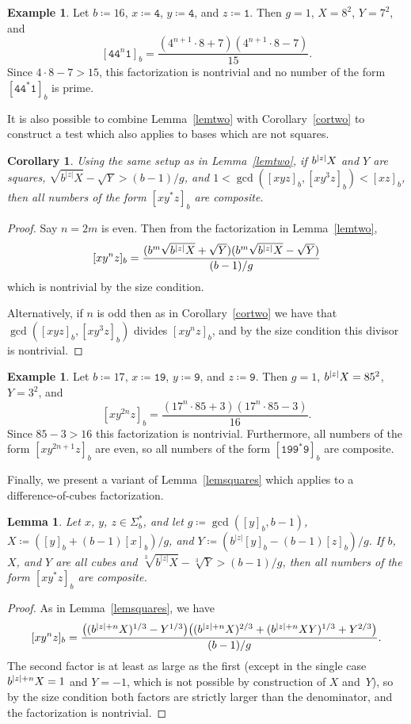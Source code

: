 \documentclass[12pt]{article}
\DeclarePairedDelimiter\abs{\lvert}{\rvert}
\theoremstyle{plain}
\newtheorem{corollary}[theorem]{Corollary}
\newtheorem{lemma}[theorem]{Lemma}
\theoremstyle{definition}
\newtheorem{example}[theorem]{Example}
\newcommand{\0}{\mathtt{0}}
\newcommand{\1}{\mathtt{1}}
\newcommand{\2}{\mathtt{2}}
\newcommand{\3}{\mathtt{3}}
\newcommand{\4}{\mathtt{4}}
\newcommand{\5}{\mathtt{5}}
\newcommand{\6}{\mathtt{6}}
\newcommand{\7}{\mathtt{7}}
\newcommand{\8}{\mathtt{8}}
\newcommand{\9}{\mathtt{9}}
\begin{document}
\begin{example}
Let $b\coloneqq16$, $x\coloneqq\4$, $y\coloneqq\4$, and $z\coloneqq\1$.  Then $g=1$, $X=8^2$, $Y=7^2$, and
\[ [\4\4^n\1]_b = \frac{(4^{n+1}\cdot8+7)(4^{n+1}\cdot8-7)}{15} . \]
Since $4\cdot8-7>15$, this factorization is nontrivial and no number of 
the form $[\4\4^*\1]_b$ is prime.
\end{example}

It is also possible to combine Lemma~\ref{lemtwo} with Corollary~\ref{cortwo} 
to construct a test which also applies to bases which are not squares.
\begin{corollary}
Using the same setup as in Lemma~\ref{lemtwo}, if\/ $b^{\abs{z}}X$ and $Y$ 
are squares, $\sqrt{b^{\lvert z\rvert}X}-\sqrt{Y}>(b-1)/g$, and
$1<\gcd([xyz]_b,[xy^3z]_b)<[xz]_b$, then all numbers of the form $[xy^*z]_b$ 
are composite.
\end{corollary}
\begin{proof}
Say $n=2m$ is even.  Then from the factorization in Lemma~\ref{lemtwo},
\[ [xy^nz]_b = \frac{(b^m\sqrt{b^{\abs{z}}X}+\sqrt{Y})(b^m\sqrt{b^{\abs{z}}X}-\sqrt{Y})}{(b-1)/g} \]
which is nontrivial by the size condition.

Alternatively, if $n$ is odd then as in Corollary~\ref{cortwo} we have that 
$\gcd([xyz]_b,[xy^3z]_b)$ divides $[xy^nz]_b$, and by the size condition this 
divisor is nontrivial.
\end{proof}
\begin{example}
Let $b\coloneqq17$, $x\coloneqq\1\9$, $y\coloneqq\9$, and $z\coloneqq\9$.  Then $g=1$, 
$b^{\abs{z}}X=85^2$, $Y=3^2$, and
\[ [xy^{2n}z]_b = \frac{(17^n\cdot85+3)(17^n\cdot85-3)}{16} . \]
Since $85-3>16$ this factorization is nontrivial.  Furthermore, all numbers 
of the form $[xy^{2n+1}z]_b$ are even, so all numbers of the form 
$[\1\9\9^*\9]_b$ are composite.
\end{example}
Finally, we present a variant of Lemma~\ref{lemsquares} which applies to a 
difference-of-cubes factorization.
\begin{lemma}\label{lemcubes}
Let $x$, $y$, $z\in\Sigma^*_b$, and let $g\coloneqq\gcd([y]_b,b-1)$, 
$X\coloneqq([y]_b+(b-1)[x]_b)/g$, and $Y\coloneqq(b^{\lvert{z}\rvert}[y]_b-(b-1)[z]_b)/g$.
If\/ $b$, $X$, and $Y$ are all cubes and 
$\sqrt[3]{b^{\lvert z\rvert}X}-\sqrt[3]{Y}>(b-1)/g$, then all numbers of 
the form
 $[xy^*z]_b$ are composite.
\end{lemma}
\begin{proof}
As in Lemma~\ref{lemsquares}, we have
\[ [xy^nz]_b = \frac{\bigl((b^{\abs{z}+n}X)^{1/3}-Y^{1/3}\bigr)\bigl((b^{\abs{z}+n}X)^{2/3}+(b^{\abs{z}+n}XY)^{1/3}+Y^{2/3}\bigr)}{(b-1)/g} . \]
The second factor is at least as large as the first (except in the 
single case $b^{\abs{z}+n}X=1$ and $Y=-1$, which is not possible by 
construction of $X$ and~$Y$),
so by the size condition both factors are strictly larger than the 
denominator, and the factorization is nontrivial.
\end{proof}
\end{document}
